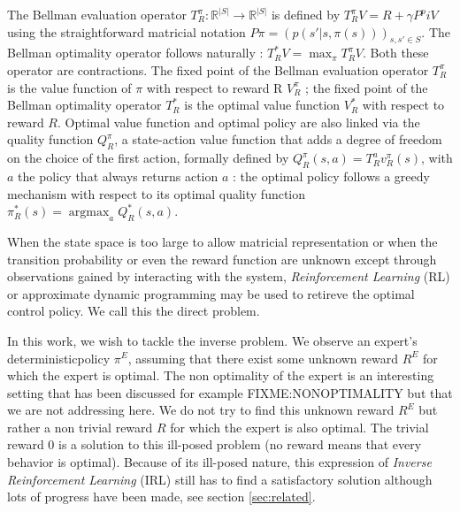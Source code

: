 \documentclass[11pt]{article}
\newcommand{\argmax}{\operatorname*{argmax}} %
\begin{document}
The Bellman evaluation operator $T^\pi_R: \mathbb{R}^{|S|} \rightarrow  \mathbb{R}^{|S|}$ is defined by $T^\pi_RV = R + \gamma P^piV$ using the straightforward matricial notation $P\pi = (p(s'|s,\pi(s)))_{s,s' \in S}$. The Bellman optimality operator follows naturally : $T^*_RV = \max_\pi T^\pi_RV$. Both these operator are contractions. The fixed point of the Bellman evaluation operator $T^\pi_R$ is the value function of $\pi$ with respect to reward R $V^\pi_R$ ; the fixed point of the Bellman optimality operator $T^*_R$ is the optimal value function $V_R^*$ with respect to reward $R$. Optimal value function and optimal policy are also linked via the quality function $Q^\pi_R$, a state-action value function that adds a degree of freedom on the choice of the first action, formally defined by $Q^\pi_R(s,a) = T^a_Rv^\pi_R(s)$, with $a$ the policy that always returns action $a$ : the optimal policy follows a greedy mechanism with respect to its optimal quality function $\pi^*_R(s) = \argmax_aQ^*_R(s,a)$.

When the state space is too large to allow matricial representation or when the transition probability or even the reward function are unknown except through observations gained by interacting with the system, \emph{Reinforcement Learning} (RL) or approximate dynamic programming may be used to retireve the optimal control policy. We call this the direct problem.

In this work, we wish to tackle the inverse problem. We observe an expert's deterministic\footnotemark[\value{footnote}] policy $\pi^E$, assuming that there exist some unknown reward $R^E$ for which the expert is optimal. The non optimality of the expert is an interesting setting that has been discussed for example FIXME:NONOPTIMALITY but that we are not addressing here. We do not try to find this unknown reward $R^E$ but rather a non trivial reward $R$ for which the expert is also optimal. The trivial reward $0$ is a solution to this ill-posed problem (no reward means that every behavior is optimal). Because of its ill-posed nature, this expression of \emph{Inverse Reinforcement Learning} (IRL) still has to find a satisfactory solution although lots of progress have been made, see section \ref{sec:related}. 
\end{document}
